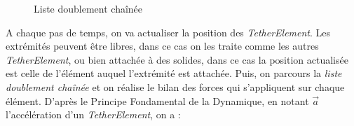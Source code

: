 				\begin{figure}[!htb]
					\centering
					\caption{Liste doublement chaînée}
					\label{fig:doubly_linked_list}
				\end{figure}

				A chaque pas de temps, on va actualiser la position des \textit{TetherElement}. Les extrémités peuvent être libres, dans ce cas on les traite comme les autres \textit{TetherElement}, ou bien attachée à des solides, dans ce cas la position actualisée est celle de l'élément auquel l'extrémité est attachée. Puis, on parcours la \textit{liste doublement chaînée} et on réalise le bilan des forces qui s'appliquent sur chaque élément. D'après le Principe Fondamental de la Dynamique, en notant $\overrightarrow{a}$ l'accélération d'un \textit{TetherElement}, on a :


